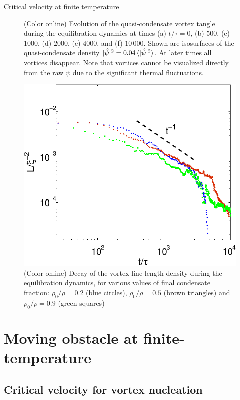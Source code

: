 \begin{chapter}{\label{cha:nonequib}Critical velocity at finite temperature}
\begin{figure}
    \caption{(Color online) Evolution of the quasi-condensate vortex tangle during the equilibration dynamics at times (a) $t/\tau=0$, (b) $500$, (c) $1000$, (d) $2000$, (e) $4000$, and (f) $10\,000$.  Shown are isosurfaces of the quasi-condensate density $|\hat{\psi}|^2 = 0.04\braket{|\hat{\psi}|^2}$. At later times all vortices disappear.  Note that vortices cannot be visualized directly from the raw $\psi$ due to the significant thermal fluctuations.
}
    \label{fig:thermal}
\end{figure}


\begin{figure}
  \centering
    \includegraphics[width=0.45\linewidth]{nonequib/figures/ll_t_2}
    \caption{(Color online) 
Decay of the vortex line-length density during the equilibration dynamics, for various values of final condensate fraction:  $\rho_0/\rho = 0.2$ (blue circles), $\rho_0/\rho = 0.5$ (brown triangles) and $\rho_0/\rho = 0.9$ (green squares)
}
    \label{fig:ll_t}
\end{figure}




\section{Moving obstacle at finite-temperature\label{sec:obstacle}}

\subsection{Critical velocity for vortex nucleation}


\end{chapter}

